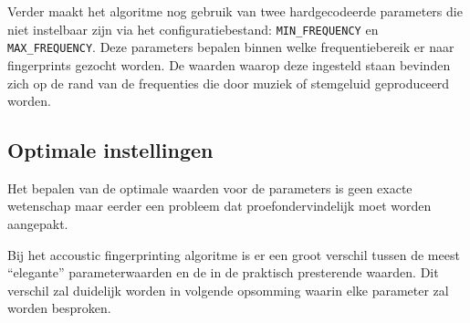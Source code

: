 Verder maakt het algoritme nog gebruik van twee hardgecodeerde parameters die niet instelbaar zijn via het configuratiebestand: \texttt{MIN\_FREQUENCY} en \texttt{MAX\_FREQUENCY}. Deze parameters bepalen binnen welke frequentiebereik er naar fingerprints gezocht worden. De waarden waarop deze ingesteld staan bevinden zich op de rand van de frequenties die door muziek of stemgeluid geproduceerd worden.

\subsection{Optimale instellingen}

Het bepalen van de optimale waarden voor de parameters is geen exacte wetenschap maar eerder een probleem dat proefondervindelijk moet worden aangepakt.

Bij het accoustic fingerprinting algoritme is er een groot verschil tussen de meest ``elegante'' parameterwaarden en de in de praktisch presterende waarden. Dit verschil zal duidelijk worden in volgende opsomming waarin elke parameter zal worden besproken.


